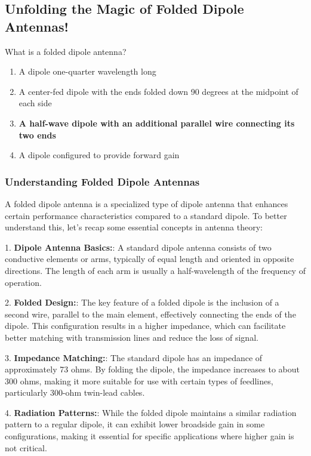 \subsection{Unfolding the Magic of Folded Dipole Antennas!}

\begin{tcolorbox}[colback=gray!10, colframe=black, title=E9C08] What is a folded dipole antenna?
\begin{enumerate}[label=\Alph*)]
    \item A dipole one-quarter wavelength long
    \item A center-fed dipole with the ends folded down 90 degrees at the midpoint of each side
    \item \textbf{A half-wave dipole with an additional parallel wire connecting its two ends}
    \item A dipole configured to provide forward gain
\end{enumerate} \end{tcolorbox}

\subsubsection{Understanding Folded Dipole Antennas}

A folded dipole antenna is a specialized type of dipole antenna that enhances certain performance characteristics compared to a standard dipole. To better understand this, let's recap some essential concepts in antenna theory:

1. \textbf{Dipole Antenna Basics:}: A standard dipole antenna consists of two conductive elements or arms, typically of equal length and oriented in opposite directions. The length of each arm is usually a half-wavelength of the frequency of operation.

2. \textbf{Folded Design:}: The key feature of a folded dipole is the inclusion of a second wire, parallel to the main element, effectively connecting the ends of the dipole. This configuration results in a higher impedance, which can facilitate better matching with transmission lines and reduce the loss of signal.

3. \textbf{Impedance Matching:}: The standard dipole has an impedance of approximately 73 ohms. By folding the dipole, the impedance increases to about 300 ohms, making it more suitable for use with certain types of feedlines, particularly 300-ohm twin-lead cables.

4. \textbf{Radiation Patterns:}: While the folded dipole maintains a similar radiation pattern to a regular dipole, it can exhibit lower broadside gain in some configurations, making it essential for specific applications where higher gain is not critical.

